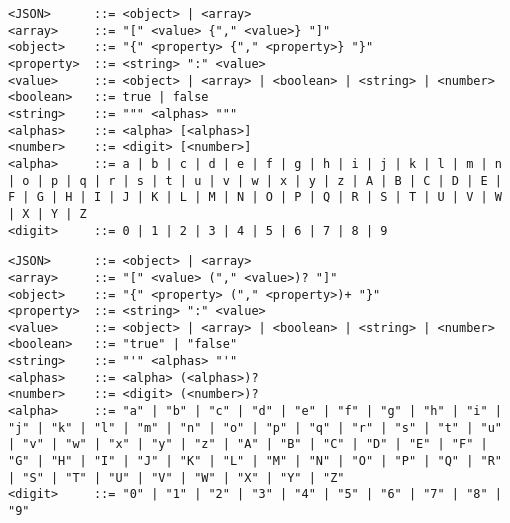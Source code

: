 \begin{minipage}{14cm}
\footnotesize
\begin{lstlisting}[caption=JSON grammar provided in~\cite{GramTest}. BNF notation with optional items enclosed in square brackets., label=JSONgrammar]
<JSON>      ::= <object> | <array>
<array>     ::= "[" <value> {"," <value>} "]"
<object>    ::= "{" <property> {"," <property>} "}"
<property>  ::= <string> ":" <value>
<value>     ::= <object> | <array> | <boolean> | <string> | <number>
<boolean>   ::= true | false
<string>    ::= """ <alphas> """
<alphas>    ::= <alpha> [<alphas>]
<number>    ::= <digit> [<number>]
<alpha>	    ::= a | b | c | d | e | f | g | h | i | j | k | l | m | n | o | p | q | r | s | t | u | v | w | x | y | z | A | B | C | D | E | F | G | H | I | J | K | L | M | N | O | P | Q | R | S | T | U | V | W | X | Y | Z
<digit>     ::= 0 | 1 | 2 | 3 | 4 | 5 | 6 | 7 | 8 | 9
\end{lstlisting}
\end{minipage}


%

\begin{minipage}{14cm}
\footnotesize
\begin{lstlisting}[caption=JSON grammar provided in~\cite{GramTest}. EBNF notation that can be parsed with online tools~\cite{bnfplayground}., label=JSONgrammarEBNF]
<JSON>      ::= <object> | <array>
<array>     ::= "[" <value> ("," <value>)? "]"
<object>    ::= "{" <property> ("," <property>)+ "}"
<property>  ::= <string> ":" <value>
<value>     ::= <object> | <array> | <boolean> | <string> | <number>
<boolean>   ::= "true" | "false"
<string>    ::= "'" <alphas> "'"
<alphas>    ::= <alpha> (<alphas>)?
<number>    ::= <digit> (<number>)?
<alpha>	    ::= "a" | "b" | "c" | "d" | "e" | "f" | "g" | "h" | "i" | "j" | "k" | "l" | "m" | "n" | "o" | "p" | "q" | "r" | "s" | "t" | "u" | "v" | "w" | "x" | "y" | "z" | "A" | "B" | "C" | "D" | "E" | "F" | "G" | "H" | "I" | "J" | "K" | "L" | "M" | "N" | "O" | "P" | "Q" | "R" | "S" | "T" | "U" | "V" | "W" | "X" | "Y" | "Z"
<digit>     ::= "0" | "1" | "2" | "3" | "4" | "5" | "6" | "7" | "8" | "9"
\end{lstlisting}
\end{minipage}


